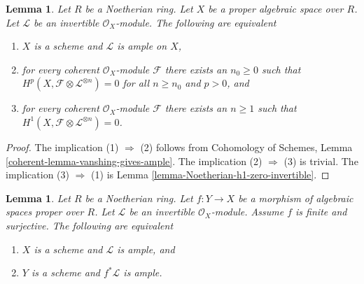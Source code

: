 \documentclass{stacks-project}
\theoremstyle{plain}
\newtheorem{lemma}[subsection]{Lemma}
\theoremstyle{definition}
\theoremstyle{remark}
\numberwithin{equation}{subsection}
\begin{document}
\begin{lemma}
\label{lemma-vanshing-gives-ample}
Let $R$ be a Noetherian ring. Let $X$ be a proper algebraic space
over $R$. Let $\mathcal{L}$ be an invertible $\mathcal{O}_X$-module.
The following are equivalent
\begin{enumerate}
\item $X$ is a scheme and $\mathcal{L}$ is ample on $X$,
\item for every coherent $\mathcal{O}_X$-module $\mathcal{F}$ there exists
an $n_0 \geq 0$ such that
$H^p(X, \mathcal{F} \otimes \mathcal{L}^{\otimes n}) = 0$ for all $n \geq n_0$
and $p > 0$, and
\item for every coherent $\mathcal{O}_X$-module $\mathcal{F}$ there exists
an $n \geq 1$ such that
$H^1(X, \mathcal{F} \otimes \mathcal{L}^{\otimes n}) = 0$.
\end{enumerate}
\end{lemma}

\begin{proof}
The implication (1) $\Rightarrow$ (2) follows from
Cohomology of Schemes, Lemma \ref{coherent-lemma-vanshing-gives-ample}.
The implication (2) $\Rightarrow$ (3) is trivial.
The implication (3) $\Rightarrow$ (1) is
Lemma \ref{lemma-Noetherian-h1-zero-invertible}.
\end{proof}

\begin{lemma}
\label{lemma-surjective-finite-morphism-ample}
Let $R$ be a Noetherian ring. Let $f : Y \to X$ be a morphism of
algebraic spaces proper over $R$. Let $\mathcal{L}$ be an
invertible $\mathcal{O}_X$-module. Assume $f$ is finite and surjective.
The following are equivalent
\begin{enumerate}
\item $X$ is a scheme and $\mathcal{L}$ is ample, and
\item $Y$ is a scheme and $f^*\mathcal{L}$ is ample.
\end{enumerate}
\end{lemma}
\end{document}
